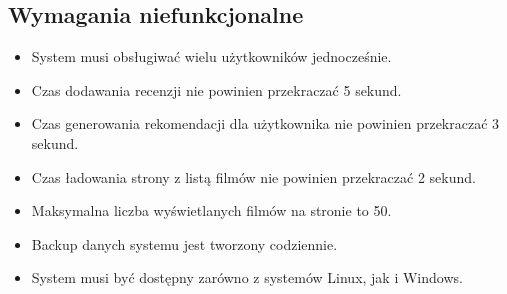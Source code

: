 \documentclass[../main.tex]{subfiles}
\begin{document}
\subsection{Wymagania niefunkcjonalne}
\begin{itemize}
	\item System musi obsługiwać wielu użytkowników jednocześnie.
	\item Czas dodawania recenzji nie powinien przekraczać 5 sekund.
	\item Czas generowania rekomendacji dla użytkownika nie powinien przekraczać 3 sekund.
	\item Czas ładowania strony z listą filmów nie powinien przekraczać 2 sekund.
	\item Maksymalna liczba wyświetlanych filmów na stronie to 50.
	\item Backup danych systemu jest tworzony codziennie.
	\item System musi być dostępny zarówno z systemów Linux, jak i Windows.
\end{itemize}
\end{document}
